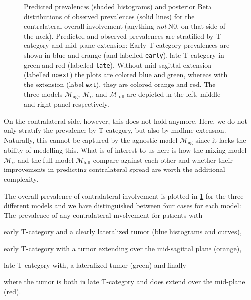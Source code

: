 \documentclass[\relativeRoot/main.tex]{subfiles}
\begin{document}
\begin{figure}
    \def\svgwidth{1.0\textwidth}
    
    \caption[
        Comparison of contralateral prevalences
    ]{
        Predicted prevalences (shaded histograms) and posterior Beta distributions of observed prevalences (solid lines) for the contralateral overall involvement (anything \emph{not} N0, on that side of the neck). Predicted and observed prevalences are stratified by T-category and mid-plane extension: Early T-category prevalences are shown in blue and orange (and labelled \texttt{early}), late T-category in green and red (labelled \texttt{late}). Without mid-sagittal extension (labelled \texttt{noext}) the plots are colored blue and green, whereas with the extension (label \texttt{ext}), they are colored orange and red. The three models $\mathcal{M}_\text{ag}$, $\mathcal{M}_\alpha$ and $\mathcal{M}_\text{full}$ are depicted in the left, middle and right panel respectively.
    }
    \label{fig:bilateral:model_comp:contra}
\end{figure}

On the contralateral side, however, this does not hold anymore. Here, we do not only stratify the prevalence by T-category, but also by midline extension. Naturally, this cannot be captured by the agnostic model $\mathcal{M}_\text{ag}$ since it lacks the ability of modelling this. What is of interest to us here is how the mixing model $\mathcal{M}_\alpha$ and the full model $\mathcal{M}_\text{full}$ compare against each other and whether their improvements in predicting contralateral spread are worth the additional complexity.

The overall prevalence of contralateral involvement is plotted in \cref{fig:bilateral:model_comp:contra} for the three different models and we have distinguished between four cases for each model: The prevalence of any contralateral involvement for patients with
\begin{enumerate*}[label={(\arabic*)}]
    \item early T-category and a clearly lateralized tumor (blue histograms and curves),
    \item early T-category with a tumor extending over the mid-sagittal plane (orange),
    \item late T-category with, a lateralized tumor (green) and finally
    \item where the tumor is both in late T-category and does extend over the mid-plane (red).
\end{enumerate*}
\end{document}
